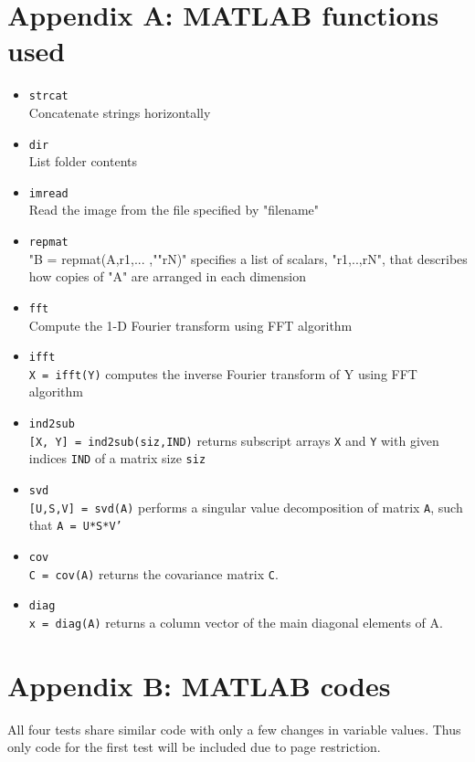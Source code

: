 \documentclass[11pt,a4paper]{article}
\numberwithin{equation}{subsection}
\begin{document}
\section*{Appendix A: MATLAB functions used}
	\begin{itemize}
		\item \texttt{strcat}\\
		Concatenate strings horizontally
		\item \texttt{dir}\\
		List folder contents
		\item \texttt{imread}\\
		Read the image from the file specified by "filename"
		\item \texttt{repmat}\\
		"B = repmat(A,r1,... ,""rN)" specifies a list of scalars, "r1,..,rN", that describes how copies of "A" are arranged in each dimension
		\item \texttt{fft}\\
		Compute the 1-D Fourier transform using FFT algorithm
		\item \texttt{ifft}\\
		\texttt{X = ifft(Y)} computes the inverse Fourier transform of Y using FFT algorithm
		\item \texttt{ind2sub}\\
\texttt{[X, Y] = ind2sub(siz,IND)} returns subscript arrays \texttt{X} and \texttt{Y} with given indices \texttt{IND} of a matrix size \texttt{siz}
		\item \texttt{svd}\\
		\texttt{[U,S,V] = svd(A)} performs a singular value decomposition of matrix \texttt{A}, such that \texttt{A = U*S*V'}
		\item \texttt{cov}\\
		\texttt{C = cov(A)} returns the covariance matrix \texttt{C}.		
		\item \texttt{diag}\\
		\texttt{x = diag(A)} returns a column vector of the main diagonal elements of A.

	\end{itemize}


\section*{Appendix B: MATLAB codes}
All four tests share similar code with only a few changes in variable values. Thus only code for the first test will be included due to page restriction.

\end{document}
